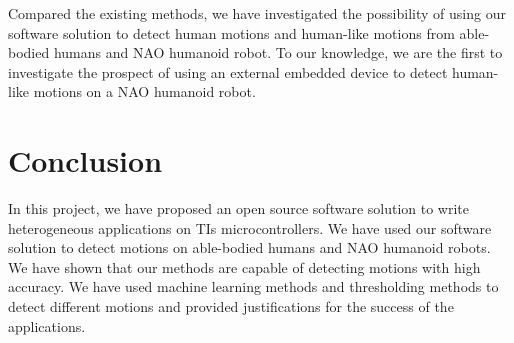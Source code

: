 \documentclass[letterpaper]{article}
\begin{document}
Compared the existing methods, we have investigated the possibility of using our software solution
to detect human motions and human-like motions from able-bodied humans and NAO humanoid robot. To
our knowledge, we are the first to investigate the prospect of using an external embedded device to
detect human-like motions on a NAO humanoid robot. 

\section{Conclusion}

In this project, we have proposed an open source software solution to write heterogeneous
applications on TIs microcontrollers. We have used our software solution to detect motions on
able-bodied humans and NAO humanoid robots. We have shown that our methods are capable of detecting
motions with high accuracy. We have used machine learning methods and thresholding methods to
detect different motions and provided justifications for the success of the applications. 



\end{document}
